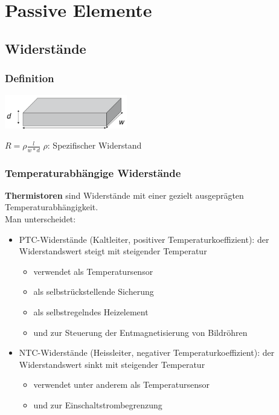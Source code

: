 \section{Passive Elemente}

\subsection{Widerstände}

\subsubsection{Definition}
\begin{multicols}{2}
\includegraphics[width=0.4\textwidth]{pictures/widerstand.png}

\columnbreak

$R=\rho\frac{l}{w*d}$
$\rho$: Spezifischer Widerstand
\end{multicols}


\subsubsection{Temperaturabhängige Widerstände}
\textbf{Thermistoren} sind Widerstände mit einer gezielt ausgeprägten
Temperaturabhängigkeit.\\Man unterscheidet:
\begin{itemize}
  \item PTC-Widerstände (Kaltleiter, positiver Temperaturkoeffizient): der
  Widerstandswert steigt mit steigender Temperatur
  \begin{itemize}
    \item verwendet als Temperatursensor
    \item als selbstrückstellende Sicherung
    \item als selbstregelndes Heizelement
    \item und zur Steuerung der Entmagnetisierung von Bildröhren
  \end{itemize}
  \item NTC-Widerstände (Heissleiter, negativer Temperaturkoeffizient): der
  Widerstandswert sinkt mit steigender Temperatur
  \begin{itemize}
    \item verwendet unter anderem als Temperatursensor
    \item und zur Einschaltstrombegrenzung
  \end{itemize}
\end{itemize}

